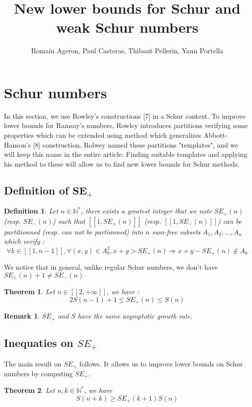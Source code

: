 \documentclass{article}
\title{New lower bounds for Schur and weak Schur numbers}
\author{Romain Ageron, Paul Casteras, Thibaut Pellerin, Yann Portella}
\newtheorem{definition}{Definition}[section]
\newtheorem{theorem}{Theorem}[section]
\newtheorem{computational theorem}{Computational Theorem}[section]
\newtheorem{remark}{Remark}[section]
\begin{document}
\section{Schur numbers}

\qquad In this section, we use Rowley's constructions [7] in a Schur context. To improve lower bounds for Ramsay's numbers, Rowley 
introduces partitions verifying some properties which can be extended using method which generalizes Abbott-Hanson's [8] construction. 
Rolwey named these partitions "templates", and we will keep this name in the entire article. Finding suitable templates and applying his 
method to these will allow us to find new lower bounds for Schur methods.

\subsection{Definition of SE\(_+\)}

\begin{definition}
	Let \( n \in \mathbb{N}^*\), there exists a greatest integer that we note \(SE_+(n)\) (resp. \(SE_-(n)\)) such that \( [\![1, SE_+(n)]\!]\) 
	(resp. \( [\![1, SE_-(n)]\!]\)) can be partitionned (resp. can not be partionned) into \(n\) sum-free subsets \(A_1, A_2, ..., A_n\) which verify :
	\[
	\forall k \in [\![1, n-1]\!], \forall (x,y) \in A_k^2, x+y > SE_+(n)
	\Longrightarrow x+y-SE_+(n) \notin A_k
	\]
\end{definition}
We notice that in general, unlike regular Schur numbers, we don't have \(SE_+(n) + 1 \neq SE_-(n)\)

\begin{theorem}
	Let \(n \in [\![2, +\infty]\!]\), we have :
	\[
	2S(n-1)+1 \leqslant SE_+(n) \leqslant S(n)
	\]
\end{theorem}

\begin{remark}
	\(SE_+\) and \(S\) have the same asymptotic growth rate.
\end{remark}


\subsection{Inequaties on \(SE_+\)} 

The main result on \(SE_+\) follows. It allows us to improve lower bounds on Schur numbers by computing \(SE_+\).

\begin{theorem}
	Let \(n, k \in \mathbb{N}^*\), we have \\
	\[ S(n+k) \geq SE_+(k+1)S(n) \]
\end{theorem}
\end{document}
